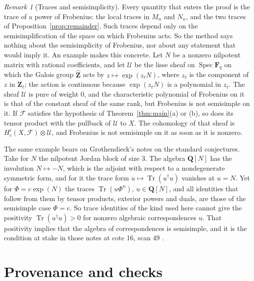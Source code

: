 \documentclass[11pt,a4paper]{article}
\theoremstyle{plain}
\theoremstyle{remark}
\newtheorem{remark}[theorem]{Remark}
\newcommand{\Fq}{\mathbf F_q}
\newcommand{\F}{\mathcal F}
\newcommand{\Tr}{\operatorname{Tr}}
\begin{document}
\begin{remark}[Traces and semisimplicity]\label{rem:ss}
Every quantity that enters the proof is the trace of a power of Frobenius: the local traces in $M_n$ and $N_n$, and
the two traces of Proposition~\ref{prop:remainder}. Such traces depend only on the semisimplification of the space
on which Frobenius acts. So the method says nothing about the semisimplicity of Frobenius, nor about any statement
that would imply it. An example makes this concrete. Let $N$ be a nonzero nilpotent matrix with rational
coefficients, and let $\mathcal U$ be the lisse sheaf on $\operatorname{Spec}\Fq$ on which the Galois group
$\widehat{\mathbf Z}$ acts by $z\mapsto\exp(z_\ell N)$, where $z_\ell$ is the component of $z$ in $\mathbf Z_\ell$;
the action is continuous because $\exp(z_\ell N)$ is a polynomial in $z_\ell$. The sheaf $\mathcal U$ is pure of
weight $0$, and the characteristic polynomial of Frobenius on it is that of the constant sheaf of the same rank, but
Frobenius is not semisimple on it. If $\F$ satisfies the hypothesis of Theorem~\ref{thm:main}(a) or (b), so does its
tensor product with the pullback of $\mathcal U$ to $X$. The cohomology of that sheaf is
$H^i_c(X,\F)\otimes\mathcal U$, and Frobenius is not semisimple on it as soon as it is nonzero.

The same example bears on Grothendieck's notes on the standard conjectures. Take for $N$ the nilpotent Jordan block
of size $3$. The algebra $\mathbf Q[N]$ has the involution $N\mapsto-N$, which is the adjoint with respect to a
nondegenerate symmetric form, and for it the trace form $u\mapsto\Tr(u^\dagger u)$ vanishes at $u=N$. Yet for
$\Phi=c\exp(N)$ the traces $\Tr(u\Phi^n)$, $u\in\mathbf Q[N]$, and all identities that follow from them by tensor
products, exterior powers and duals, are those of the semisimple case $\Phi=c$. So trace identities of the kind
used here cannot give the positivity $\Tr(u^\dagger u)>0$ for nonzero algebraic correspondences $u$. That
positivity implies that the algebra of correspondences is semisimple, and it is the condition at stake in those
notes at cote 16, scan 49 \cite{Archive}.
\end{remark}

\section*{Provenance and checks}
\end{document}

